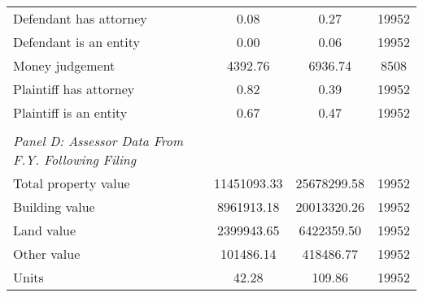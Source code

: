 \begin{table}[htbp]
\begin{tabular}{l*{1}{ccc}}
\hspace{0.25cm}Defendant has attorney&        0.08&        0.27&       19952\\
\hspace{0.25cm}Defendant is an entity&        0.00&        0.06&       19952\\
\hspace{0.25cm}Money judgement&     4392.76&     6936.74&        8508\\
\hspace{0.25cm}Plaintiff has attorney&        0.82&        0.39&       19952\\
\hspace{0.25cm}Plaintiff is an entity&        0.67&        0.47&       19952\\
\vspace{0.1em} \\ \emph{Panel D: Assessor Data From F.Y. Following Filing}&            &            &            \\
\hspace{0.25cm}Total property value& 11451093.33& 25678299.58&       19952\\
\hspace{0.25cm}Building value&  8961913.18& 20013320.26&       19952\\
\hspace{0.25cm}Land value&  2399943.65&  6422359.50&       19952\\
\hspace{0.25cm}Other value&   101486.14&   418486.77&       19952\\
\hspace{0.25cm}Units&       42.28&      109.86&       19952\\
\bottomrule
\end{tabular}
\end{table}
